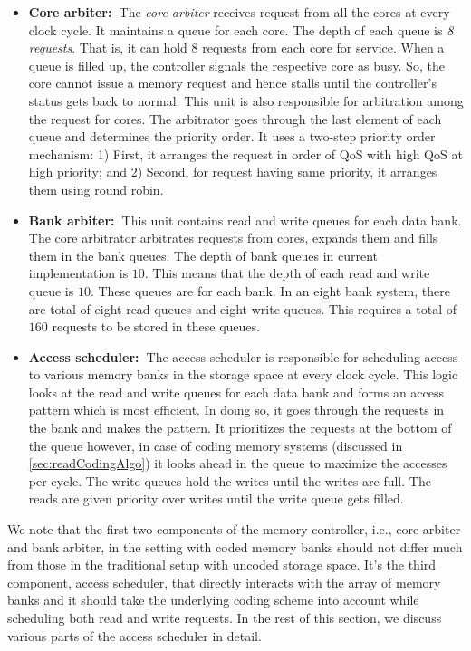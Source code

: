\begin{itemize}
\item \textbf{Core arbiter:~}The {\em core arbiter} receives request from all the cores at every clock cycle.  
It maintains a queue for each core. The depth of each queue is {\em 8 requests}.  
That is, it can hold 8 requests from each core for service. When a queue is 
filled up, the controller signals the respective core as busy. So, the core 
cannot issue a memory request and hence stalls until the controller's status 
gets back to normal. This unit is also responsible for arbitration among the 
request for cores. The arbitrator goes through the last element of each queue 
and determines the priority order. It uses a two-step priority order mechanism:
1) First, it arranges the request in order of QoS with high QoS at high 
priority; and  2) {Second}, for request having same priority, it arranges them using 
round robin.
\item \textbf{Bank arbiter:~}This unit contains read  and write queues for each data bank. The core arbitrator arbitrates requests from 
cores, expands them and fills them in the bank queues. The depth of bank queues 
in current implementation is $10$. This means that the depth of each read 
and write queue is $10$. These queues are for each bank. In an eight bank system, 
there are total of eight read queues and eight write queues. This requires a 
total of $160$ requests to be stored in these queues.
\item \textbf{Access scheduler:~}The access scheduler is responsible for scheduling access to
various memory banks in the storage space at every clock cycle.  This logic looks at the read and write queues for 
each data bank and forms an access pattern which is most efficient. In doing so, it 
goes through the requests in the bank and makes the pattern. It prioritizes the
requests at the bottom of the queue however, in case of coding memory systems 
(discussed in \ref{sec:readCodingAlgo}) it looks ahead in the queue to maximize 
the accesses per cycle. The write queues hold the writes until the writes are 
full. The reads are given priority over writes until the write queue gets 
filled.
\end{itemize}

{\color{red} We note that the first two components of the memory controller, i.e., core arbiter and bank arbiter, in the setting with coded memory banks should not differ much from those in the traditional setup with uncoded storage space. It's the third component, access scheduler, that directly interacts with the array of memory banks and it should take the underlying coding scheme into account while scheduling both read and write requests.} In the rest of this section, we discuss various parts of the access scheduler in detail.

